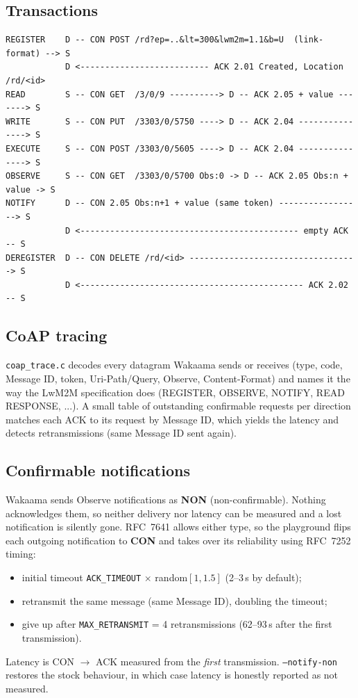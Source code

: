\documentclass[11pt,a4paper]{article}
\newcommand{\code}[1]{\texttt{#1}}
\begin{document}
\subsection{Transactions}
\begin{lstlisting}
REGISTER    D -- CON POST /rd?ep=..&lt=300&lwm2m=1.1&b=U  (link-format) --> S
            D <-------------------------- ACK 2.01 Created, Location /rd/<id>
READ        S -- CON GET  /3/0/9 ----------> D -- ACK 2.05 + value -------> S
WRITE       S -- CON PUT  /3303/0/5750 ----> D -- ACK 2.04 ---------------> S
EXECUTE     S -- CON POST /3303/0/5605 ----> D -- ACK 2.04 ---------------> S
OBSERVE     S -- CON GET  /3303/0/5700 Obs:0 -> D -- ACK 2.05 Obs:n + value -> S
NOTIFY      D -- CON 2.05 Obs:n+1 + value (same token) -----------------> S
            D <-------------------------------------------- empty ACK -- S
DEREGISTER  D -- CON DELETE /rd/<id> ----------------------------------> S
            D <--------------------------------------------- ACK 2.02 -- S
\end{lstlisting}

\subsection{CoAP tracing}
\code{coap\_trace.c} decodes every datagram Wakaama sends or receives (type,
code, Message ID, token, Uri-Path/Query, Observe, Content-Format) and names it
the way the LwM2M specification does (REGISTER, OBSERVE, NOTIFY, READ
RESPONSE, ...). A small table of outstanding confirmable requests per direction
matches each ACK to its request by Message ID, which yields the latency and
detects retransmissions (same Message ID sent again).

\subsection{Confirmable notifications}
Wakaama sends Observe notifications as \textbf{NON} (non-confirmable). Nothing
acknowledges them, so neither delivery nor latency can be measured and a lost
notification is silently gone. RFC~7641 allows either type, so the playground
flips each outgoing notification to \textbf{CON} and takes over its
reliability using RFC~7252 timing:
\begin{itemize}
  \item initial timeout \code{ACK\_TIMEOUT} $\times$ random$[1, 1.5]$ (2--3\,s by default);
  \item retransmit the same message (same Message ID), doubling the timeout;
  \item give up after \code{MAX\_RETRANSMIT} = 4 retransmissions
        (62--93\,s after the first transmission).
\end{itemize}
Latency is CON $\rightarrow$ ACK measured from the \emph{first} transmission.
\code{--notify-non} restores the stock behaviour, in which case latency is
honestly reported as not measured.
\end{document}
